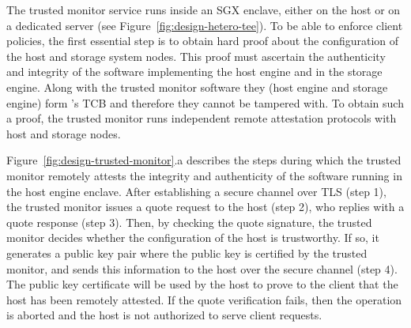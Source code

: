 The trusted monitor service runs inside an SGX enclave, either on the host or on a dedicated server (see Figure~\ref{fig:design-hetero-tee}). To be able to enforce client policies, the first essential step is to obtain hard proof about the configuration of the host and storage system nodes. This proof must ascertain the authenticity and integrity of the software implementing the host engine and in the storage engine. Along with the trusted monitor software they (host engine and storage engine) form \project{}'s TCB and therefore they cannot be tampered with. To obtain such a proof, the trusted monitor runs independent remote attestation protocols with host and storage nodes.



 Figure~\ref{fig:design-trusted-monitor}.a describes the steps during which the trusted monitor remotely attests the integrity and authenticity of the software running in the host engine enclave. After establishing a secure channel over TLS (step 1), the trusted monitor issues a quote request to the host (step 2), who replies with a quote response (step 3). Then, by checking the quote signature, the trusted monitor decides whether the configuration of the host is trustworthy. If so, it generates a public key pair where the public key is certified by the trusted monitor, and sends this information to the host over the secure channel (step 4). The public key certificate will be used by the host to prove to the client that the host has been remotely attested. If the quote verification fails, then the operation is aborted and the host is not authorized to serve \project client requests.

